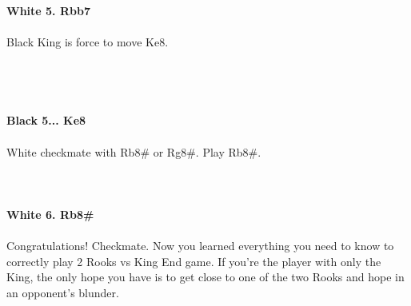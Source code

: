 \documentclass{article}
\begin{document}

\\
\\
\textbf{White 5. Rbb7}\\
\\
Black King is force to move Ke8.\\\\
\\

\\
\\
\textbf{Black 5... Ke8}\\
\\
White checkmate with Rb8\# or Rg8\#. Play Rb8\#.\\
\\

\\
\\
\textbf{White 6. Rb8\#}\\
\\
Congratulations! Checkmate. Now you learned everything you need to know to correctly play 2 Rooks vs King End game. If you're the player with only the King, the only hope you have is to get close to one of the two Rooks and hope in an opponent's blunder.
\end{document}
